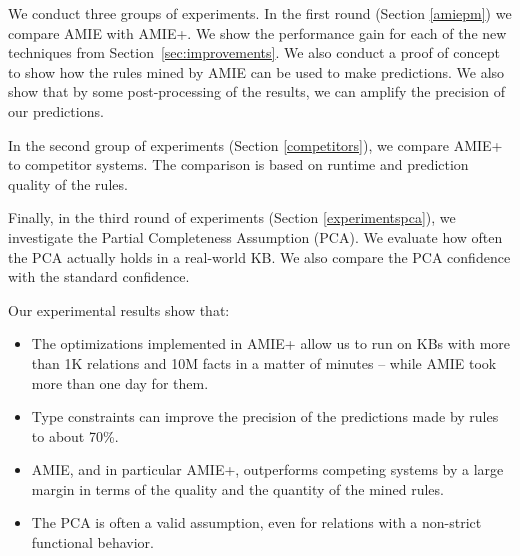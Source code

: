 We conduct three groups of experiments.  
In the first round (Section \ref{amiepm}) we compare AMIE with AMIE+. We show the performance gain 
for each of the new techniques from Section~\ref{sec:improvements}. 
We also conduct a proof of concept to show how the rules mined by AMIE can be used to make predictions. We also show
that by some post-processing of the results, we can amplify the precision of our predictions. 

In the second group of experiments (Section \ref{competitors}), we compare AMIE+ to competitor systems. 
The comparison is based on runtime and prediction quality of the rules.

Finally, in the third round of experiments (Section \ref{experimentspca}), we investigate the Partial Completeness Assumption (PCA). 
We evaluate how often the PCA actually holds in a real-world KB. We also compare the PCA confidence with the standard confidence. 

Our experimental results show that:
\begin{itemize}
 \item The optimizations implemented in AMIE+ allow us to run on KBs with more than 1K relations and 10M facts in a matter of minutes -- while AMIE took more than one day for them.
 \item Type constraints can improve the precision of the predictions made by rules to about 70\%.
 \item AMIE, and in particular AMIE+, outperforms competing systems by a large margin in terms of the quality and the quantity of the mined rules.
 \item The PCA is often a valid assumption, even for relations with a non-strict functional behavior. 
\end{itemize}

